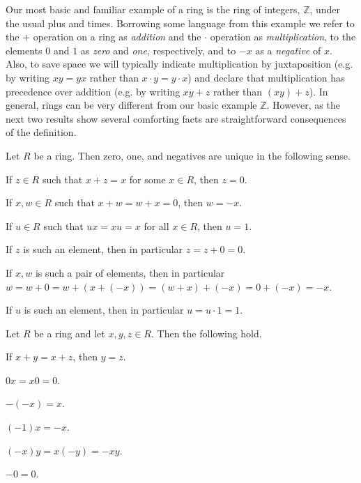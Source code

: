 Our most basic and familiar example of a ring is the ring of integers, $\mathbb{Z}$, under the usual plus and times. Borrowing some language from this example we refer to the $+$ operation on a ring as \emph{addition} and the $\cdot$ operation as \emph{multiplication}, to the elements $0$ and $1$ as \emph{zero} and \emph{one}, respectively, and to $-x$ as a \emph{negative} of $x$. Also, to save space we will typically indicate multiplication by juxtaposition (e.g. by writing $xy=yx$ rather than $x \cdot y = y \cdot x$) and declare that multiplication has precedence over addition (e.g. by writing $xy + z$ rather than $(xy)+z$). In general, rings can be very different from our basic example $\mathbb{Z}$. However, as the next two results show several comforting facts are straightforward consequences of the definition.

\begin{prp}
\label{prp:ring:uniq}
Let $R$ be a ring. Then zero, one, and negatives are unique in the following sense.
\begin{enumerate*}
\item{\label{prp:ring:uniq:zero}} 
If $z \in R$ such that $x+z=x$ for some $x \in R$, then $z = 0$.
\item{\label{prp:ring:uniq:neg}} 
If $x,w \in R$ such that $x+w=w+x=0$, then $w = -x$.
\item{\label{prp:ring:uniq:one}} 
If $u \in R$ such that $ux=xu=x$ for all $x \in R$, then $u = 1$.
\end{enumerate*}
\end{prp}

\begin{theproof}
\begin{inparaenum}
\item If $z$ is such an element, then in particular $z = z+0 = 0$.
\item If $x,w$ is such a pair of elements, then in particular $w = w+0 = w+(x+(-x)) = (w+x)+(-x) = 0+(-x) = -x$.
\item If $u$ is such an element, then in particular $u = u \cdot 1 = 1$.
\end{inparaenum}
\end{theproof}

\begin{prp}
\label{prp:ring:bookkeeping}
Let $R$ be a ring and let $x,y,z \in R$. Then the following hold.
\begin{enumerate*}
\item{\label{prp:ring:bookkeeping:cancel}}
If $x+y = x+z$, then $y = z$.
\item{\label{prp:ring:bookkeeping:annihil}}
$0x=x0=0$.
\item{\label{prp:ring:bookkeeping:double-neg}}
$-(-x) = x$.
\item $(-1)x = -x$.
\item $(-x)y = x(-y) = -xy$.
\item{\label{prp:ring:bookkeeping:neg-zero}}
$-0 = 0$.
\end{enumerate*}
\end{prp}

